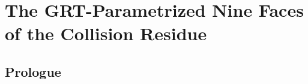 
\providecommand{\SCchtop}{\mathsf{SC}^{\mathrm{ch},\mathrm{top}}}
\providecommand{\FM}{\mathrm{FM}}
\providecommand{\Conf}{\mathrm{Conf}}
\providecommand{\Ran}{\mathrm{Ran}}
\providecommand{\MC}{\mathrm{MC}}
\providecommand{\End}{\mathrm{End}}
\providecommand{\cA}{\mathcal{A}}
\providecommand{\cB}{\mathcal{B}}
\providecommand{\cF}{\mathcal{F}}
\providecommand{\cL}{\mathcal{L}}
\providecommand{\cW}{\mathcal{W}}
\providecommand{\Walg}{\mathcal{W}}
\providecommand{\fg}{\mathfrak{g}}
\providecommand{\fgrt}{\mathfrak{grt}_1}
\providecommand{\GRT}{\mathrm{GRT}_1}
\providecommand{\GT}{\mathrm{GT}_1}
\providecommand{\Lie}{\mathsf{Lie}}
\providecommand{\Ass}{\mathsf{Ass}}
\providecommand{\Face}{\mathrm{Face}}
\providecommand{\Fsuper}{\mathrm{Face}^{\mathrm{super}}}
\providecommand{\Gsuper}{\mathrm{GRT}^{\mathrm{super}}}
\providecommand{\Res}{\operatorname{Res}}
\providecommand{\coll}{\mathrm{coll}}
\providecommand{\Vir}{\mathrm{Vir}}
\providecommand{\id}{\mathrm{id}}
\providecommand{\GC}{\mathsf{GC}}
\providecommand{\Def}{\mathrm{Def}}
\providecommand{\Tam}{\mathrm{Tam}}
\providecommand{\KZ}{\mathrm{KZ}}
\providecommand{\rat}{\mathrm{rat}}
\providecommand{\mot}{\mathrm{mot}}
\providecommand{\MZV}{\mathrm{MZV}}
\providecommand{\grt}{\mathrm{grt}}
\providecommand{\DNP}{\mathrm{DNP}}
\providecommand{\GZ}{\mathrm{GZ}}
\providecommand{\FFR}{\mathrm{FFR}}
\providecommand{\STS}{\mathrm{STS}}
\providecommand{\Gaud}{\mathrm{Gaud}}
\providecommand{\Sug}{\mathrm{Sug}}
\providecommand{\Bbbk}{\mathbb{k}}

\chapter{The GRT-Parametrized Nine Faces of the Collision Residue}
\label{ch:grt-seven-faces}

\section*{Prologue}


